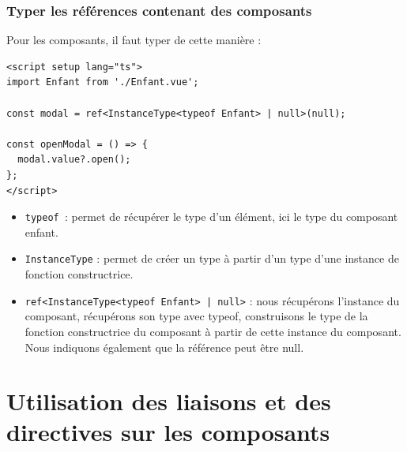 \documentclass{article}
\begin{document}
\subsubsection{Typer les références contenant des composants}
Pour les composants, il faut typer de cette manière :
\begin{verbatim}
<script setup lang="ts">
import Enfant from './Enfant.vue';

const modal = ref<InstanceType<typeof Enfant> | null>(null);

const openModal = () => {
  modal.value?.open();
};
</script>
\end{verbatim}
\begin{itemize}
\item {\tt typeof }: permet de récupérer le type d'un élément, ici le type du composant enfant.

\item {\tt InstanceType} : permet de créer un type à partir d'un type d'une instance de fonction constructrice.

\item {\tt ref<InstanceType<typeof Enfant> | null>} : nous récupérons l'instance du composant, récupérons son type avec {\color{monOrange}typeof}, construisons le type de la fonction constructrice du composant à partir de cette instance du composant. Nous indiquons également que la référence peut être {\color{monOrange}null}.

\end{itemize}


\section{Utilisation des liaisons et des directives sur les composants}
\end{document}
